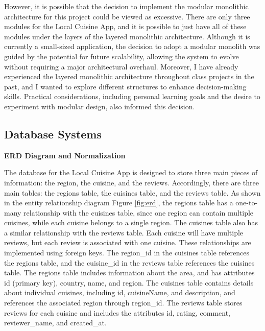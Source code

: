 However, it is possible that the decision to implement the modular monolithic architecture for this project 
could be viewed as excessive. There are only three modules for the Local Cuisine App, and it is possible to 
just have all of these modules under the layers of the layered monolithic architecture. 
Although it is currently a small-sized application, the decision to adopt a modular monolith was guided by the potential for future scalability,
allowing the system to evolve without requiring a major architectural overhaul. 
Moreover, I have already experienced the layered monolithic architecture throughout class
projects in the past, and I wanted to explore different structures to enhance decision-making skills.
Practical considerations, including personal learning goals and the desire to experiment with modular design, also informed this decision.


\subsection{Database Systems}




\noindent \textbf{ERD Diagram and Normalization}

\erdFigure

The database for the Local Cuisine App is designed to store three main pieces of information: the region, the cuisine, and the reviews.
Accordingly, there are three main tables: the regions table, the cuisines table, and the reviews table. 
As shown in the entity relationship diagram Figure \ref{fig:erd}, the regions table has a one-to-many relationship with the cuisines table, 
since one region can contain multiple cuisines, while each cuisine belongs to a single region. 
The cuisines table also has a similar relationship with the reviews table. Each cuisine will have multiple reviews,
but each review is associated with one cuisine. 
These relationships are implemented using foreign keys. The region\_id in the cuisines table references the regions table,
and the cuisine\_id in the reviews table references the cuisines table.
The regions table includes information about the area, and has attributes id (primary key), country, name, and region. 
The cuisines table contains details about individual cuisines, including id, cuisineName,
and description, and references the associated region through region\_id.
The reviews table stores reviews for each cuisine and includes the attributes id, rating, comment, reviewer\_name, and created\_at.

